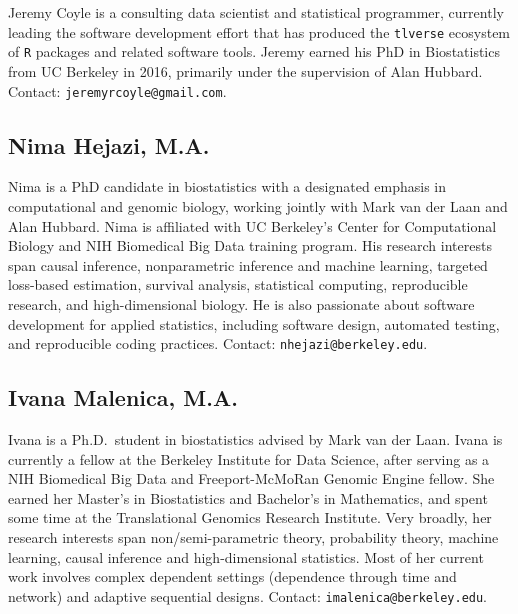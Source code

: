 \documentclass[a4paper,11pt]{texMemo}
\begin{document}
\vspace{-.5em}

Jeremy Coyle is a consulting data scientist and statistical programmer,
currently leading the software development effort that has produced the
\texttt{tlverse} ecosystem of \texttt{R} packages and related software tools.
Jeremy earned his PhD in Biostatistics from UC Berkeley in 2016, primarily under
the supervision of Alan Hubbard. Contact: \texttt{jeremyrcoyle@gmail.com}.

\vspace{-.5em}

\subsection*{Nima Hejazi, M.A.}

\vspace{-.5em}

Nima is a PhD candidate in biostatistics with a designated emphasis in
computational and genomic biology, working jointly with Mark van der Laan and
Alan Hubbard. Nima is affiliated with UC Berkeley's Center for Computational
Biology and NIH Biomedical Big Data training program. His research interests
span causal inference, nonparametric inference and machine learning, targeted
loss-based estimation, survival analysis, statistical computing, reproducible
research, and high-dimensional biology. He is also passionate about software
development for applied statistics, including software design, automated
testing, and reproducible coding practices. Contact:
\texttt{nhejazi@berkeley.edu}.

\vspace{-.5em}

\subsection*{Ivana Malenica, M.A.}

\vspace{-.5em}

Ivana is a Ph.D.~student in biostatistics advised by Mark van der Laan. Ivana is
currently a fellow at the Berkeley Institute for Data Science, after serving as
a NIH Biomedical Big Data and Freeport-McMoRan Genomic Engine fellow. She earned
her Master's in Biostatistics and Bachelor's in Mathematics, and spent some time
at the Translational Genomics Research Institute. Very broadly, her research
interests span non/semi-parametric theory, probability theory, machine learning,
causal inference and high-dimensional statistics. Most of her current work
involves complex dependent settings (dependence through time and network) and
adaptive sequential designs. Contact: \texttt{imalenica@berkeley.edu}.
\end{document}
